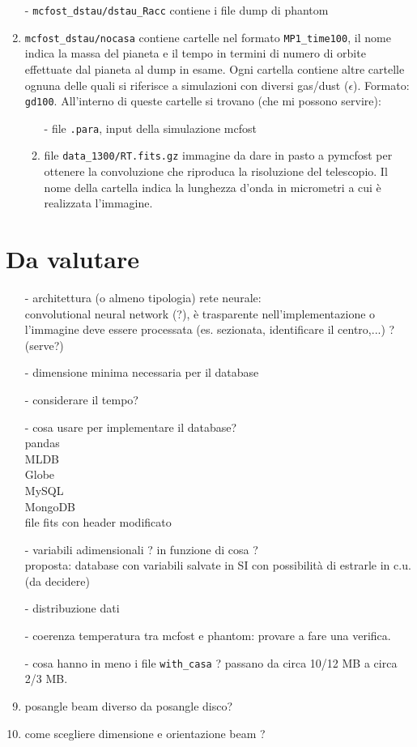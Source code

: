 \documentclass[DIN, pagenumber=false, fontsize=11pt, parskip=half]{scrartcl}
\begin{document}
\begin{enumerate}
 \item[-] \lstinline{mcfost_dstau/dstau_Racc} contiene i file dump di phantom
 \item[-] \lstinline{mcfost_dstau/nocasa} contiene cartelle nel formato \lstinline{MP1_time100}, il nome indica la massa del pianeta e il tempo in termini di numero di orbite effettuate dal pianeta al dump in esame. Ogni cartella contiene
 altre cartelle ognuna delle quali si riferisce a simulazioni con diversi gas/dust ($\epsilon$). Formato: \lstinline{gd100}. All'interno di queste cartelle si trovano (che mi possono servire):
 \begin{enumerate}
 \item[-] file \lstinline{.para}, input della simulazione mcfost 
 \item[-] file \lstinline{data_1300/RT.fits.gz} immagine da dare in pasto a pymcfost per ottenere la convoluzione che riproduca la risoluzione del telescopio. Il nome della cartella indica la lunghezza d'onda in micrometri a cui è realizzata l'immagine.
\end{enumerate}
\end{enumerate}


\section{Da valutare}
\begin{enumerate}
 \item[-] architettura (o almeno tipologia) rete neurale: \\ convolutional neural network (?), è trasparente nell'implementazione o l'immagine deve essere processata (es. sezionata, identificare il centro,...) ? (serve?)
 \item[-] dimensione minima necessaria per il database
 \item[-] considerare il tempo?
 \item[-] cosa usare per implementare il database? \\ pandas \\ MLDB \\ Globe \\ MySQL \\ MongoDB \\ file fits con header modificato
 \item[-] variabili adimensionali ? in funzione di cosa ? \\ proposta: database con variabili salvate in SI con possibilità di estrarle in c.u. (da decidere)
 \item[-] distribuzione dati
 \item[-] coerenza temperatura tra mcfost e phantom: provare a fare una verifica. \item[-] cosa hanno in meno i file \lstinline{with_casa} ? passano da circa 10/12 MB a circa 2/3 MB.
 \item[-] posangle beam diverso da posangle disco?
 \item[-] come scegliere dimensione e orientazione beam ? 
\end{enumerate}
\end{document}
